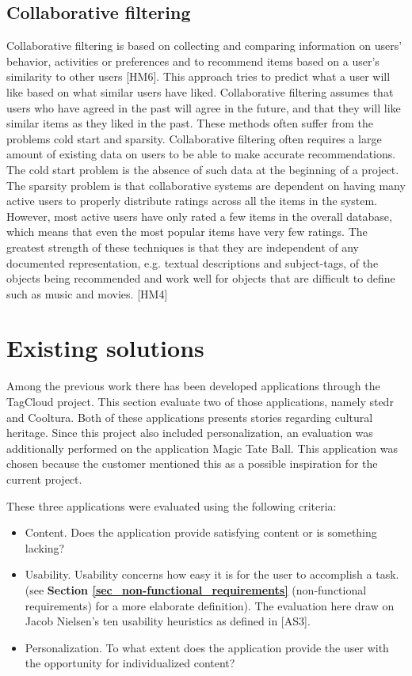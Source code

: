 \subsection{Collaborative filtering}

Collaborative filtering is based on collecting and comparing information on users’ behavior, activities or preferences and to recommend items based on a user’s similarity to other users [HM6]. This approach tries to predict what a user will like based on what similar users have liked. Collaborative filtering assumes that users who have agreed in the past will agree in the future, and that they will like similar items as they liked in the past. These methods often suffer from the problems cold start and sparsity. Collaborative filtering often requires a large amount of existing data on users to be able to make accurate recommendations. The cold start problem is the absence of such data at the beginning of a project. The sparsity problem is that collaborative systems are dependent on having many active users to properly distribute ratings across all the items in the system. However, most active users have only rated a few items in the overall database, which means that even the most popular items have very few ratings. The greatest strength of these techniques is that they are independent of any documented representation, e.g. textual descriptions and subject-tags, of the objects being recommended and work well for objects that are difficult to define such as music and movies. [HM4]

\section{Existing solutions}

Among the previous work there has been developed applications through the TagCloud project. This section evaluate two of those applications, namely stedr and Cooltura. Both of these applications presents stories regarding cultural heritage. Since this project also included personalization, an evaluation was additionally performed on the application Magic Tate Ball. This application was chosen because the customer mentioned this as a possible inspiration for the current project. \newline

These three applications were evaluated using the following criteria:
\begin{itemize}
\item Content. Does the application provide satisfying content or is something lacking?
\item Usability. Usability concerns how easy it is for the user to accomplish a task. (see \textbf{Section \ref{sec_non-functional_requirements}} (non-functional requirements) for a more elaborate definition). The evaluation here draw on Jacob Nielsen’s ten usability heuristics as defined in [AS3].  
\item Personalization. To what extent does the application provide the user with the opportunity for individualized content?
\end{itemize}

